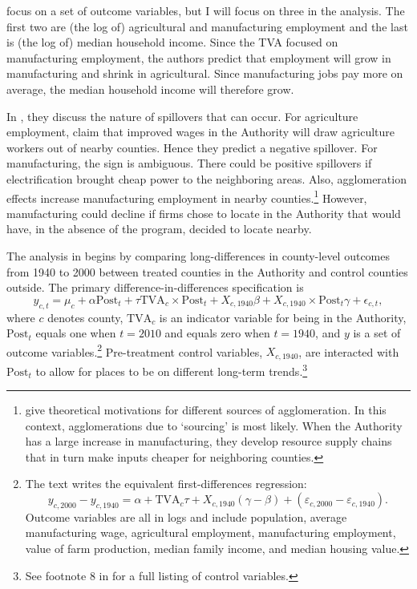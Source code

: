 \documentclass[11pt]{article}
\begin{document}
\citet{Kline_Moretti_2014} focus on a set of outcome variables, but I will focus on three in the analysis. The first two are (the log of) agricultural and manufacturing employment and the last is (the log of) median household income. Since the TVA focused on manufacturing employment, the authors predict that employment will grow in manufacturing and shrink in agricultural. Since manufacturing jobs pay more on average, the median household income will therefore grow. 

In \citet{Kline_Moretti_2014}, they discuss the nature of spillovers that can occur. For agriculture employment, \citet{Kline_Moretti_2014} claim that improved wages in the Authority will draw agriculture workers out of nearby counties. Hence they predict a negative spillover. For manufacturing, the sign is ambiguous. There could be positive spillovers if electrification brought cheap power to the neighboring areas. Also, agglomeration effects increase manufacturing employment in nearby counties.\footnote{\citet{Duranton_Puga_2003} give theoretical motivations for different sources of agglomeration. In this context, agglomerations due to `sourcing' is most likely. When the Authority has a large increase in manufacturing, they develop resource supply chains that in turn make inputs cheaper for neighboring counties.} However, manufacturing could decline if firms chose to locate in the Authority that would have, in the absence of the program, decided to locate nearby. 

The analysis in \citet{Kline_Moretti_2014} begins by comparing long-differences in county-level outcomes from 1940 to 2000 between treated counties in the Authority and control counties outside. The primary difference-in-differences specification is
\begin{equation}\label{eq:tva}
    y_{c, t} = \mu_c + \alpha \text{Post}_t + \tau \text{TVA}_c \times \text{Post}_t + X_{c, 1940} \beta + X_{c, 1940} \times \text{Post}_t \gamma + \epsilon_{c,t},
\end{equation}
where $c$ denotes county, $\text{TVA}_c$ is an indicator variable for being in the Authority, $\text{Post}_t$ equals one when $t = 2010$ and equals zero when $t = 1940$, and $y$ is a set of outcome variables.\footnote{The text writes the equivalent first-differences regression: \[ 
    y_{c, 2000} - y_{c, 1940} = \alpha + \text{TVA}_c \tau + X_{c, 1940} (\gamma - \beta) + (\varepsilon_{c, 2000} - \varepsilon_{c, 1940}). 
\] Outcome variables are all in logs and include population, average manufacturing wage, agricultural employment, manufacturing employment, value of farm production, median family income, and median housing value.} Pre-treatment control variables, $X_{c,1940}$, are interacted with $\text{Post}_t$ to allow for places to be on different long-term trends.\footnote{See footnote 8 in \citet{Kline_Moretti_2014} for a full listing of control variables.} 
\end{document}
